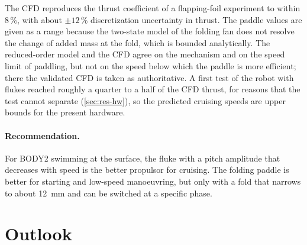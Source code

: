 The CFD reproduces the thrust coefficient of a flapping-foil experiment to within 8\,\%, with about $\pm12$\,\% discretization
uncertainty in thrust. The paddle values are given as a range because the two-state model of the folding fan does not resolve
the change of added mass at the fold, which is bounded analytically. The reduced-order model and the CFD agree on the mechanism and on the speed limit of
paddling, but not on the speed below which the paddle is more efficient; there the validated CFD is taken as authoritative. A first
test of the robot with flukes reached roughly a quarter to a half of the CFD thrust, for reasons that the test cannot separate (\cref{sec:res-hw}), so the predicted cruising speeds are upper bounds for the present hardware.

\paragraph{Recommendation.} For BODY2 swimming at the surface, the fluke with a pitch amplitude that decreases with speed is the better
propulsor for cruising. The folding paddle is better for starting and low-speed manoeuvring, but only with a fold that narrows
to about \SI{12}{\milli\metre} and can be switched at a specific phase.

\section{Outlook}

